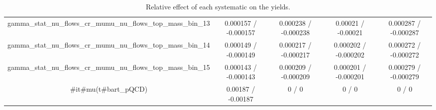 \documentclass[10pt]{article}
\begin{document}
\begin{table}[htbp]
\begin{center}
\begin{tabular}{|c|c|c|c|c|}
  gamma_stat_nu_flows_cr_mumu_nu_flows_top_mass_bin_13 & 0.000157 / -0.000157 & 0.000238 / -0.000238 & 0.00021 / -0.00021 & 0.000287 / -0.000287 \\ 
  gamma_stat_nu_flows_cr_mumu_nu_flows_top_mass_bin_14 & 0.000149 / -0.000149 & 0.000217 / -0.000217 & 0.000202 / -0.000202 & 0.000272 / -0.000272 \\ 
  gamma_stat_nu_flows_cr_mumu_nu_flows_top_mass_bin_15 & 0.000143 / -0.000143 & 0.000209 / -0.000209 & 0.000201 / -0.000201 & 0.000279 / -0.000279 \\ 
  #it{#mu}(t#bar{t}_{pQCD}) & 0.00187 / -0.00187 & 0 / 0 & 0 / 0 & 0 / 0 \\ 
\hline 
\end{tabular} 
\caption{Relative effect of each systematic on the yields.} 
\end{center} 
\end{table} 
\end{document}
